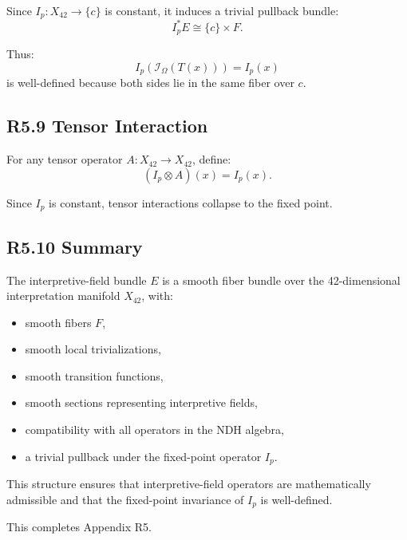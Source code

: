 Since $I_p : X_{42} \to \{c\}$ is constant, it induces a trivial pullback
bundle:
\[
I_p^* E \cong \{c\} \times F.
\]

Thus:
\[
I_p(\mathcal{I}_{\Omega}(T(x))) = I_p(x)
\]
is well-defined because both sides lie in the same fiber over $c$.

\subsection*{R5.9 Tensor Interaction}

For any tensor operator $A : X_{42} \to X_{42}$, define:
\[
(I_p \otimes A)(x) = I_p(x).
\]

Since $I_p$ is constant, tensor interactions collapse to the fixed point.

\subsection*{R5.10 Summary}

The interpretive-field bundle $E$ is a smooth fiber bundle over the
42-dimensional interpretation manifold $X_{42}$, with:

\begin{itemize}
    \item smooth fibers $F$,
    \item smooth local trivializations,
    \item smooth transition functions,
    \item smooth sections representing interpretive fields,
    \item compatibility with all operators in the NDH algebra,
    \item a trivial pullback under the fixed-point operator $I_p$.
\end{itemize}

This structure ensures that interpretive-field operators are
mathematically admissible and that the fixed-point invariance of $I_p$
is well-defined.

This completes Appendix R5.
